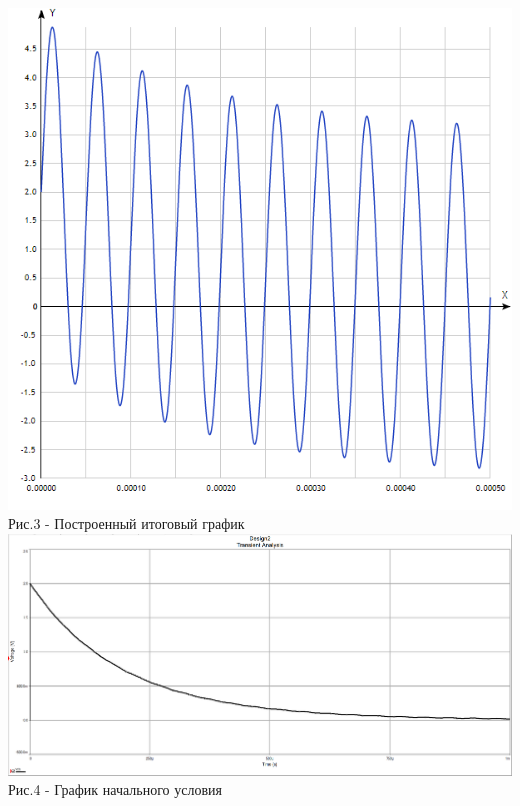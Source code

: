 \documentclass[12pt, a4paper]{report}
\begin{document}
    \begin{center}
        \includegraphics[scale = 0.9]{photo2.png}\\\bigskip
        Рис.3 - Построенный итоговый график\\\vfill
        \includegraphics[scale = 0.3]{photo3.png}\\\bigskip
        Рис.4 - График начального условия
    \end{center}

    \newpage
\end{document}
